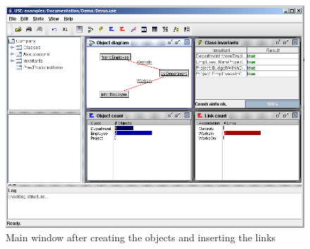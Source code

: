 \documentclass[a4paper,titlepage,oneside,final]{scrreprt} %
\begin{document}
\begin{figure}[ht]
\centering
\includegraphics[scale=0.5]{Screenshots/GUI/ViewsWithLinks.png}
\caption{Main window after creating the objects and inserting the links}
\label{fig:ViewsWithLinks}
\end{figure}
\end{document}

